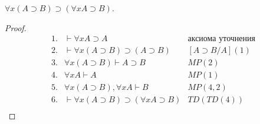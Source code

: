 \begin{propthm}
    $\forall x (A\supset B) \supset (\forall x A \supset B)$.
\end{propthm}
\begin{proof}
    \begin{equation*}
        \begin{array}{llr}
            1.  & \vdash \forall x A \supset A
                & \text{аксиома уточнения} 
                \\
            2.  & \vdash \forall x (A \supset B) \supset (A \supset B)
                & [A \supset B / A](1)
                \\
            3.  & \forall x (A \supset B) \vdash A \supset B
                & MP(2)
                \\
            4.  & \forall x A \vdash A
                & MP(1)
                \\
            5.  & \forall x (A \supset B), \forall x A \vdash B
                & MP(4, 2)
                \\
            6.  & \vdash \forall x (A\supset B) \supset (\forall x A \supset B)
               & TD(TD(4))
                \\
        \end{array}
    \end{equation*}
\end{proof}